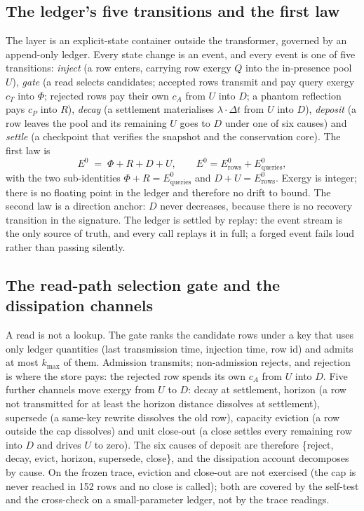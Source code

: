 \documentclass[11pt,a4paper]{article}
\newcommand{\Ezero}{E^{0}}
\begin{document}
\subsection{The ledger's five transitions and the first law}
\label{sec:transitions}
The layer is an explicit-state container outside the transformer, governed by an append-only ledger. Every state change is an event, and every event is one of five transitions: \emph{inject} (a row enters, carrying row exergy $Q$ into the in-presence pool $U$), \emph{gate} (a read selects candidates; accepted rows transmit and pay query exergy $c_T$ into $\Phi$; rejected rows pay their own $c_A$ from $U$ into $D$; a phantom reflection pays $c_P$ into $R$), \emph{decay} (a settlement materialises $\lambda \cdot \Delta t$ from $U$ into $D$), \emph{deposit} (a row leaves the pool and its remaining $U$ goes to $D$ under one of six causes) and \emph{settle} (a checkpoint that verifies the snapshot and the conservation core). The first law is
\begin{equation}
\Ezero \;=\; \Phi + R + D + U, \qquad \Ezero = \Ezero_{\mathrm{rows}} + \Ezero_{\mathrm{queries}},
\label{eq:first-law}
\end{equation}
with the two sub-identities $\Phi + R = \Ezero_{\mathrm{queries}}$ and $D + U = \Ezero_{\mathrm{rows}}$. Exergy is integer; there is no floating point in the ledger and therefore no drift to bound. The second law is a direction anchor: $D$ never decreases, because there is no recovery transition in the signature. The ledger is settled by replay: the event stream is the only source of truth, and every call replays it in full; a forged event fails loud rather than passing silently.

\subsection{The read-path selection gate and the dissipation channels}
A read is not a lookup. The gate ranks the candidate rows under a key that uses only ledger quantities (last transmission time, injection time, row id) and admits at most $k_{\max}$ of them. Admission transmits; non-admission rejects, and rejection is where the store pays: the rejected row spends its own $c_A$ from $U$ into $D$. Five further channels move exergy from $U$ to $D$: decay at settlement, horizon (a row not transmitted for at least the horizon distance dissolves at settlement), supersede (a same-key rewrite dissolves the old row), capacity eviction (a row outside the cap dissolves) and unit close-out (a close settles every remaining row into $D$ and drives $U$ to zero). The six causes of deposit are therefore \{reject, decay, evict, horizon, supersede, close\}, and the dissipation account decomposes by cause. On the frozen trace, eviction and close-out are not exercised (the cap is never reached in 152 rows and no close is called); both are covered by the self-test and the cross-check on a small-parameter ledger, not by the trace readings.
\end{document}
